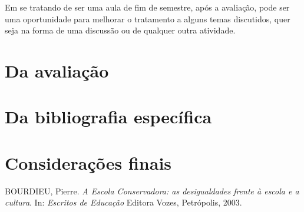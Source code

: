\documentclass[12pt,a4paper]{article}
\begin{document}
	Em se tratando de ser uma aula de fim de semestre, após a avaliação, 
	pode ser uma oportunidade para melhorar o tratamento a alguns temas 
	discutidos, quer seja na forma de uma discussão ou de qualquer outra 
	atividade. 




	\newpage
	
	\section{Da avaliação}

	\section{Da bibliografia específica}

	\newpage

	\section{Considerações finais}

	
	\begin{thebibliography}{9}
		
		BOURDIEU, Pierre. 
		\textit{A Escola Conservadora: as desigualdades 
		frente à escola e a cultura}. 
		In: \textit{Escritos de Educação} 
		Editora Vozes, Petrópolis, 2003.
				

	\end{thebibliography}
	
	
	
\end{document}
